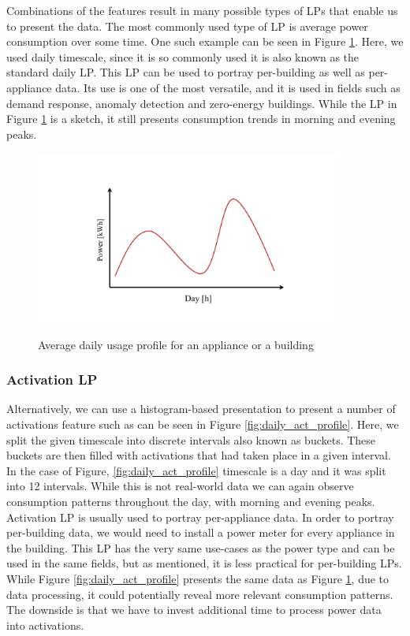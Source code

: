 Combinations of the features result in many possible types of LPs that enable us to present the data.
The most commonly used type of LP is average power consumption over some time.
One such example can be seen in Figure \ref{fig:daily_power_profile}. 
Here, we used daily timescale, since it is so commonly used it is also known as the standard daily LP. 
This LP can be used to portray per-building as well as per-appliance data.
Its use is one of the most versatile, and it is used in fields such as demand response, anomaly detection and zero-energy buildings.
While the LP in Figure \ref{fig:daily_power_profile} is a sketch, it still presents consumption trends in morning and evening peaks.
\begin{figure}[H]
	\centering
	\caption{Average daily usage profile for an appliance or a building}
	\includegraphics[width=0.9\textwidth]{Figures/profile_sketches/slide1.pdf}
	\label{fig:daily_power_profile}
\end{figure}

\subsubsection{Activation LP}
Alternatively, we can use a histogram-based presentation to present a number of activations feature such as can be seen in Figure \ref{fig:daily_act_profile}.
Here, we split the given timescale into discrete intervals also known as buckets. 
These buckets are then filled with activations that had taken place in a given interval. 
In the case of Figure, \ref{fig:daily_act_profile} timescale is a day and it was split into 12 intervals.
While this is not real-world data we can again observe consumption patterns throughout the day, with morning and evening peaks. 
Activation LP is usually used to portray per-appliance data. 
In order to portray per-building data, we would need to install a power meter for every appliance in the building.
This LP has the very same use-cases as the power type and can be used in the same fields, but as mentioned, it is less practical for per-building LPs.
While Figure \ref{fig:daily_act_profile} presents the same data as Figure \ref{fig:daily_power_profile},
due to data processing, it could potentially reveal more relevant consumption patterns.
The downside is that we have to invest additional time to process power data into activations.

